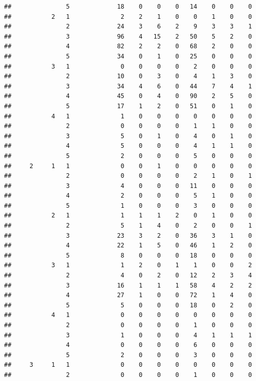 \documentclass{article}\usepackage[]{graphicx}\usepackage[]{xcolor}
\makeatletter
\newenvironment{kframe}{%
 \def\at@end@of@kframe{}%
 \ifinner\ifhmode%
  \def\at@end@of@kframe{\end{minipage}}%
  \begin{minipage}{\columnwidth}%
 \fi\fi%
 \def\FrameCommand##1{\hskip\@totalleftmargin \hskip-\fboxsep
 \colorbox{shadecolor}{##1}\hskip-\fboxsep
     \hskip-\linewidth \hskip-\@totalleftmargin \hskip\columnwidth}%
 \MakeFramed {\advance\hsize-\width
   \@totalleftmargin\z@ \linewidth\hsize
   \@setminipage}}%
 {\par\unskip\endMakeFramed%
 \at@end@of@kframe}
\newenvironment{knitrout}{}{} %
\makeatother
\begin{document}
\begin{knitrout}
\begin{kframe}
\begin{verbatim}
##               5             18    0    0    0   14    0    0    0
##           2   1              2    2    1    0    0    1    0    0
##               2             24    3    6    2    9    3    3    1
##               3             96    4   15    2   50    5    2    0
##               4             82    2    2    0   68    2    0    0
##               5             34    0    1    0   25    0    0    0
##           3   1              0    0    0    0    2    0    0    0
##               2             10    0    3    0    4    1    3    0
##               3             34    4    6    0   44    7    4    1
##               4             45    0    4    0   90    2    5    0
##               5             17    1    2    0   51    0    1    0
##           4   1              1    0    0    0    0    0    0    0
##               2              0    0    0    0    1    1    0    0
##               3              5    0    1    0    4    0    1    0
##               4              5    0    0    0    4    1    1    0
##               5              2    0    0    0    5    0    0    0
##     2     1   1              0    0    1    0    0    0    0    0
##               2              0    0    0    0    2    1    0    1
##               3              4    0    0    0   11    0    0    0
##               4              2    0    0    0    5    1    0    0
##               5              1    0    0    0    3    0    0    0
##           2   1              1    1    1    2    0    1    0    0
##               2              5    1    4    0    2    0    0    1
##               3             23    3    2    0   36    3    1    0
##               4             22    1    5    0   46    1    2    0
##               5              8    0    0    0   18    0    0    0
##           3   1              1    2    0    1    1    0    0    2
##               2              4    0    2    0   12    2    3    4
##               3             16    1    1    1   58    4    2    2
##               4             27    1    0    0   72    1    4    0
##               5              5    0    0    0   18    0    2    0
##           4   1              0    0    0    0    0    0    0    0
##               2              0    0    0    0    1    0    0    0
##               3              1    0    0    0    4    1    1    1
##               4              0    0    0    0    6    0    0    0
##               5              2    0    0    0    3    0    0    0
##     3     1   1              0    0    0    0    0    0    0    0
##               2              0    0    0    0    1    0    0    0

\end{verbatim}
\end{kframe}
\end{knitrout}
\end{document}
